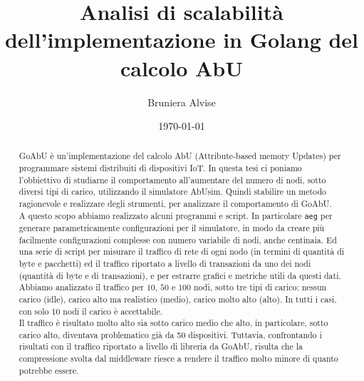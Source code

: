 \documentclass[12pt, a4paper]{article}
\title{Analisi di scalabilità dell'implementazione in Golang del calcolo AbU}
\author{Bruniera Alvise}
\affil{Università degli studi di Udine}
\date{\today}
\newcommand{\michele}[1]{{\color{red}Michele:~}{\itshape``{#1}''}}
\newcommand{\aeg}[0]{{\lstinline{aeg}}\xspace}
\begin{document}
\maketitle

\newpage
\begin{abstract}
    GoAbU è un'implementazione del calcolo AbU (Attribute-based memory Updates) per programmare sistemi distribuiti di dispositivi IoT. In questa tesi ci poniamo l'obbiettivo di studiarne il comportamento all'aumentare del numero di nodi, sotto diversi tipi di carico, utilizzando il simulatore AbUsim. Quindi stabilire un metodo ragionevole e realizzare degli strumenti, per analizzare il comportamento di GoAbU.\\
    A questo scopo abbiamo realizzato alcuni programmi e script. In particolare \aeg per generare parametricamente configurazioni per il simulatore, in modo da creare più facilmente configurazioni complesse con numero variabile di nodi, anche centinaia. Ed una serie di script per misurare il traffico di rete di ogni nodo (in termini di quantità di byte e pacchetti) ed il traffico riportato a livello di transazioni da uno dei nodi (quantità di byte e di transazioni), e per estrarre grafici e metriche utili da questi dati.\\
    Abbiamo analizzato il traffico per $10$, $50$ e $100$ nodi, sotto tre tipi di carico: nessun carico (idle), carico alto ma realistico (medio), carico molto alto (alto). In tutti i casi, con solo 10 nodi il carico è accettabile.\\
    Il traffico è risultato molto alto sia sotto carico medio che alto, in particolare, sotto carico alto, diventava problematico già da 50 dispositivi. Tuttavia, confrontando i risultati con il traffico riportato a livello di libreria da GoAbU, risulta che la compressione svolta dal middleware riesce a rendere il traffico molto minore di quanto potrebbe essere.

\end{abstract}
\end{document}

